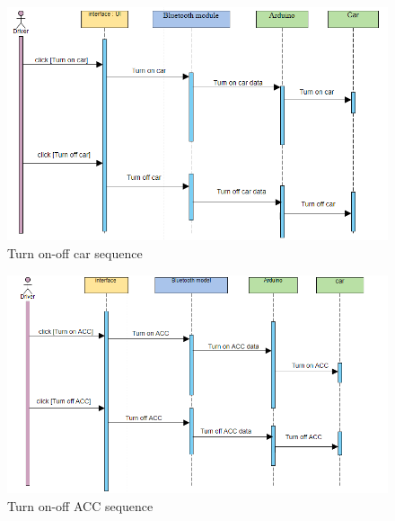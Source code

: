 \documentclass[12pt,a4paper]{report}
\begin{document}
\subsection{\fontsize{12}{12}\selectfont{ACC Sequence Diagrams:}}

\begin{figure}[H]
    \centering
    \graphicspath{ {./images/} }
    \includegraphics[width=1\textwidth]{case3.png}
    \caption{Turn on-off car sequence }
    \label{fig:mesh1}
\end{figure}
\begin{figure}[H]
    \centering
    \graphicspath{ {./images/} }
    \includegraphics[width=1\textwidth]{case4.png}
    \caption{Turn on-off ACC sequence}
    \label{fig:mesh1}
\end{figure}
\end{document}
